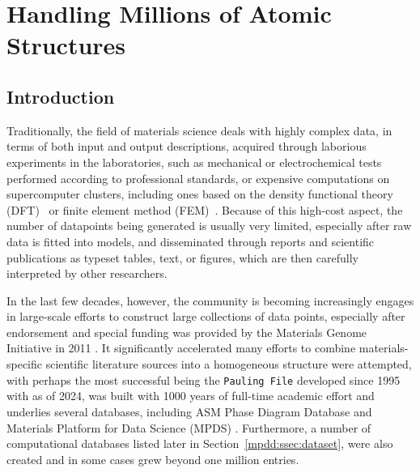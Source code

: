 \chapter{Handling Millions of Atomic Structures} \label{chap:mpdd}



\section{Introduction} \label{mpdd:sec:background}

Traditionally, the field of materials science deals with highly complex data, in terms of both input and output descriptions, acquired through laborious experiments in the laboratories, such as mechanical or electrochemical tests performed according to professional standards, or expensive computations on supercomputer clusters, including ones based on the density functional theory (DFT)~\cite{Kohn1996DensityStructure} or finite element method (FEM)~\cite{Liu2022EightyFuture}. Because of this high-cost aspect, the number of datapoints being generated is usually very limited, especially after raw data is fitted into models, and disseminated through reports and scientific publications as typeset tables, text, or figures, which are then carefully interpreted by other researchers.

In the last few decades, however, the community is becoming increasingly engages in large-scale efforts to construct large collections of data points, especially after endorsement and special funding was provided by the Materials Genome Initiative in 2011 \cite{SubcommitteeontheMaterialsGenomeInitiative2021MaterialsPlan, Agren2023CALPHADAnniversary, Olson2023GenomicDynamics}. It significantly accelerated many efforts to combine materials-specific scientific literature sources into a homogeneous structure were attempted, with perhaps the most successful being the \texttt{Pauling File} developed since 1995 with as of 2024, was built with 1000 years of full-time academic effort \cite{Blokhin2018TheGenome} and underlies several databases, including ASM Phase Diagram Database \cite{ASMInternational} and Materials Platform for Data Science (MPDS) \cite{Blokhin2018TheGenome}. Furthermore, a number of computational databases listed later in Section~\ref{mpdd:ssec:dataset}, were also created and in some cases grew beyond one million entries.

